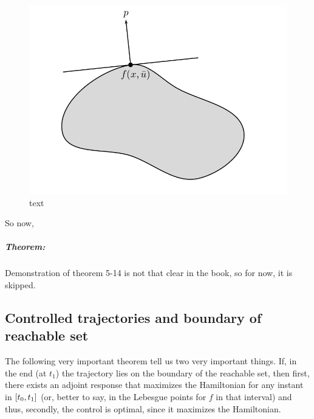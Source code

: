 \begin{figure}[h!]
	\includegraphics[width=\linewidth]{imgs/512-514.png}
	\caption{text}
	\label{fig-5.2}
\end{figure}

So now, 
\subparagraph[5.14]{Theorem:} Demonstration of theorem 5-14 is not that clear in the book, so for now, it is skipped.


\subsection{Controlled trajectories and boundary of reachable set}
The following very important theorem tell us two very important things. If, in the end (at $t_1$) the trajectory lies on the boundary of the reachable set, then first, there exists an adjoint response that maximizes the Hamiltonian for any instant in $[t_0,t_1]$ (or, better to say, in the Lebesgue points for $f$ in that interval) and thus, secondly, the control is optimal, since it maximizes the Hamiltonian. 
